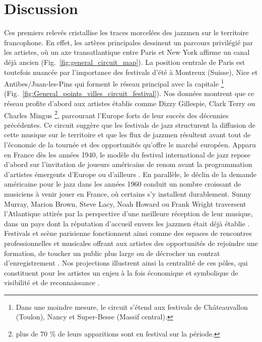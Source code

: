 \documentclass[fra, final]{anthology-ch}      %
\begin{document}
	\section{Discussion}
    Ces premiers relevés cristallise les traces morcelées des jazzmen sur le territoire francophone. En effet, les artères principales dessinent un parcours privilégié par les artistes, où un axe transatlantique entre Paris et New York affirme un canal déjà ancien (Fig.~\ref{fig:general_circuit_map}). La position centrale de Paris est toutefois nuancée par l'importance des festivals d'été à Montreux (Suisse), Nice et Antibes/Juan-les-Pins qui forment le réseau principal avec la capitale \footnote{Dans une moindre mesure, le circuit s'étend aux festivals de Châteauvallon (Toulon), Nancy et Super-Besse (Massif central).} (Fig.~\ref{fig:General_points_villes_circuit_festival}). Nos données montrent que ce réseau profite d'abord aux artistes établis comme Dizzy Gillespie, Clark Terry ou Charles Mingus \footnote{plus de 70 \% de leurs apparitions sont en festival sur la période.}, parcourant l'Europe forts de leur succès des décennies précédentes. Ce circuit suggère que les festivals de jazz structurent la diffusion de cette musique sur le territoire et que les flux de jazzmen résultent avant tout de l'économie de la tournée et des opportunités qu'offre le marché européen. Apparu en France dès les années 1940, le modèle du festival international de jazz repose d'abord sur l'invitation de joueurs américains de renom avant la programmation d'artistes émergents d'Europe ou d'ailleurs \cite{mckay_festivals_2018}. En parallèle, le déclin de la demande américaine pour le jazz dans les années 1960 conduit un nombre croissant de musiciens à venir jouer en France, où certains s'y installent durablement. Sunny Murray, Marion Brown, Steve Lacy, Noah Howard ou Frank Wright traversent l'Atlantique attirés par la perspective d'une meilleure réception de leur musique, dans un pays dont la réputation d'accueil envers les jazzmen était déjà établie \cite{drott_free_2008}. Festivals et scène parisienne fonctionnent ainsi comme des espaces de rencontres professionnelles et musicales offrant aux artistes des opportunités de rejoindre une formation, de toucher un public plus large \cite{mckay_festivals_2018} ou de décrocher un contrat d'enregistrement \cite{drott_free_2008}. Nos projections illustrent ainsi la centralité de ces pôles, qui constituent pour les artistes un enjeu à la fois économique et symbolique de visibilité et de reconnaissance \cite{picaud_comment_2017}.
\end{document}
